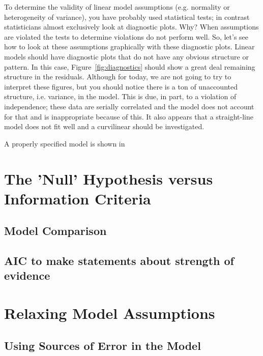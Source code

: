 \documentclass{article}\usepackage[]{graphicx}\usepackage[]{color}
\begin{document}
To determine the validity of linear model assumptions (e.g. normality or heterogeneity of variance), you have probably used statistical tests; in contrast statisticians almost exclusively look at diagnostic plots. Why?  When assumptions are violated the tests to determine violations do not perform well. So, let's see how to look at these assumptions graphically with these diagnostic plots. Linear models should have diagnostic plots that do not have any obvious structure or pattern. In this case, Figure~\ref{fig:diagnostics} should show a great deal remaining structure in the residuals. Although for today, we are not going to try to interpret these figures, but you should notice there is a ton of unaccounted structure, i.e. variance, in the model. This is due, in part, to a violation of independence; these data are serially correlated and the model does not account for that and is inappropriate because of this. It also appears that a straight-line model does not fit well and a curvilinear should be investigated.

A properly specified model is shown in 


\section{The 'Null' Hypothesis versus Information Criteria}

\subsection{Model Comparison}

\subsection{AIC to make statements about strength of evidence}


\section{Relaxing Model Assumptions}

\subsection{Using Sources of Error in the Model}
\end{document}

